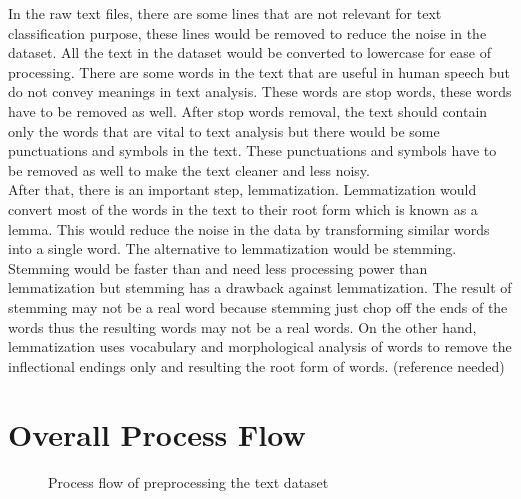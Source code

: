 In the raw text files, there are some lines that are not relevant for text classification purpose, these lines would be removed to reduce the noise in the dataset. All the text in the dataset would be converted to lowercase for ease of processing. There are some words in the text that are useful in human speech but do not convey meanings in text analysis. These words are stop words, these words have to be removed as well. After stop words removal, the text should contain only the words that are vital to text analysis but there would be some punctuations and symbols in the text. These punctuations and symbols have to be removed as well to make the text cleaner and less noisy.\\

After that, there is an important step, lemmatization. Lemmatization would convert most of the words in the text to their root form which is known as a lemma. This would reduce the noise in the data by transforming similar words into a single word. The alternative to lemmatization would be stemming. Stemming would be faster than and need less processing power than lemmatization but stemming has a drawback against lemmatization. The result of stemming may not be a real word because stemming just chop off the ends of the words thus the resulting words may not be a real words. On the other hand, lemmatization uses vocabulary and morphological analysis of words to remove the inflectional endings only and resulting the root form of words.
(reference needed)


\section{Overall Process Flow}
\begin{figure}
\centering
{}
\caption{Process flow of preprocessing the text dataset}
\label{fig: preprocessText}
\end{figure}

